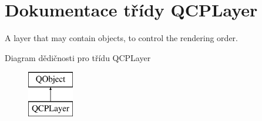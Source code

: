\hypertarget{classQCPLayer}{}\section{Dokumentace třídy Q\+C\+P\+Layer}
\label{classQCPLayer}


A layer that may contain objects, to control the rendering order.  


Diagram dědičnosti pro třídu Q\+C\+P\+Layer\begin{figure}[H]
\begin{center}
\leavevmode
\includegraphics[height=2.000000cm]{classQCPLayer}
\end{center}
\end{figure}
